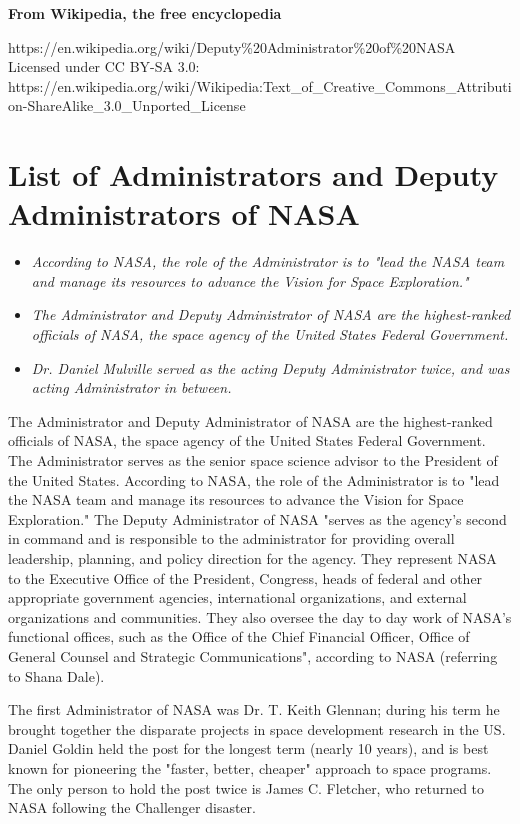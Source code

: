 \textbf{From Wikipedia, the free encyclopedia}

https://en.wikipedia.org/wiki/Deputy\%20Administrator\%20of\%20NASA\\
Licensed under CC BY-SA 3.0:\\
https://en.wikipedia.org/wiki/Wikipedia:Text\_of\_Creative\_Commons\_Attribution-ShareAlike\_3.0\_Unported\_License

\section{List of Administrators and Deputy Administrators of
NASA}\label{list-of-administrators-and-deputy-administrators-of-nasa}

\begin{itemize}
\item
  \emph{According to NASA, the role of the Administrator is to "lead the
  NASA team and manage its resources to advance the Vision for Space
  Exploration."}
\item
  \emph{The Administrator and Deputy Administrator of NASA are the
  highest-ranked officials of NASA, the space agency of the United
  States Federal Government.}
\item
  \emph{Dr. Daniel Mulville served as the acting Deputy Administrator
  twice, and was acting Administrator in between.}
\end{itemize}

The Administrator and Deputy Administrator of NASA are the
highest-ranked officials of NASA, the space agency of the United States
Federal Government. The Administrator serves as the senior space science
advisor to the President of the United States. According to NASA, the
role of the Administrator is to "lead the NASA team and manage its
resources to advance the Vision for Space Exploration." The Deputy
Administrator of NASA "serves as the agency's second in command and is
responsible to the administrator for providing overall leadership,
planning, and policy direction for the agency. They represent NASA to
the Executive Office of the President, Congress, heads of federal and
other appropriate government agencies, international organizations, and
external organizations and communities. They also oversee the day to day
work of NASA's functional offices, such as the Office of the Chief
Financial Officer, Office of General Counsel and Strategic
Communications", according to NASA (referring to Shana Dale).

The first Administrator of NASA was Dr. T. Keith Glennan; during his
term he brought together the disparate projects in space development
research in the US. Daniel Goldin held the post for the longest term
(nearly 10 years), and is best known for pioneering the "faster, better,
cheaper" approach to space programs. The only person to hold the post
twice is James C. Fletcher, who returned to NASA following the
Challenger disaster.


